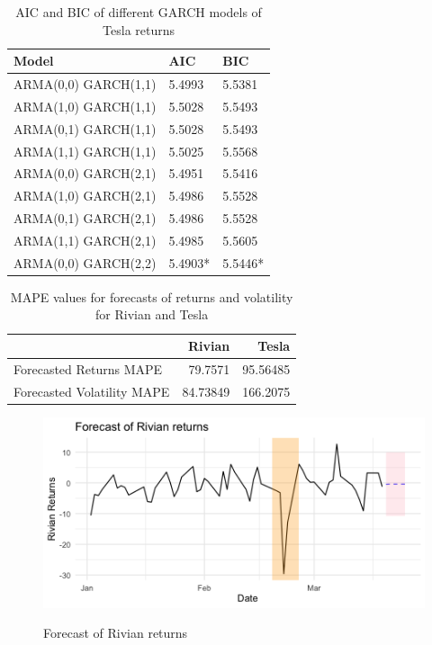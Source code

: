 \documentclass[a4paper,12pt]{article}
\begin{document}
\begin{table}[!h]
    \centering
    \begin{tabular}{lll}
    \hline
        Model & AIC & BIC \\ \hline
        ARMA(0,0) GARCH(1,1) & 5.4993 & 5.5381 \\ 
        ARMA(1,0) GARCH(1,1) & 5.5028 & 5.5493 \\ 
        ARMA(0,1) GARCH(1,1) & 5.5028 & 5.5493 \\ 
        ARMA(1,1) GARCH(1,1) & 5.5025 & 5.5568 \\ 
        ARMA(0,0) GARCH(2,1) & 5.4951 & 5.5416 \\ 
        ARMA(1,0) GARCH(2,1) & 5.4986 & 5.5528 \\ 
        ARMA(0,1) GARCH(2,1) & 5.4986 & 5.5528 \\ 
        ARMA(1,1) GARCH(2,1) & 5.4985 & 5.5605 \\ 
        ARMA(0,0) GARCH(2,2) & 5.4903* & 5.5446* \\ 
    \hline
    \end{tabular}
    \caption{AIC and BIC of different GARCH models of Tesla returns}
\end{table}

\begin{table}[!h]
    \centering
    \begin{tabular}{lrr}
    \hline
    & Rivian & Tesla \\ 
    \hline
    Forecasted Returns MAPE & 79.7571 & 95.56485 \\
    Forecasted Volatility MAPE & 84.73849 & 166.2075 \\ 
    \hline
    \end{tabular}
    \caption{MAPE values for forecasts of returns and volatility for Rivian and Tesla}
    \label{theone}
\end{table}

\begin{figure}[!h]
\caption{Forecast of Rivian returns}
\begin{center}
\includegraphics[width=0.7\columnwidth]{Rivian_frcst.png}
\label{temps}
\end{center}
\end{figure}
\end{document}
